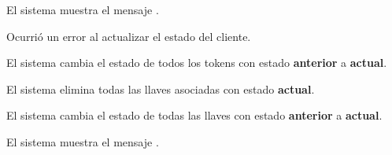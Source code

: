 {\begin{trayectoriaAlternativa}
    \item El sistema muestra el mensaje
      .


  \end{trayectoriaAlternativa}

  \begin{trayectoriaAlternativa}
    {Ocurrió un error al actualizar el estado del cliente.}

    \item El sistema cambia el estado de todos los tokens con estado
      \textbf{anterior} a \textbf{actual}.

    \item El sistema elimina todas las llaves asociadas con estado
      \textbf{actual}.

    \item El sistema cambia el estado de todas las llaves con estado
      \textbf{anterior} a \textbf{actual}.

    \item El sistema muestra el mensaje
      .


  \end{trayectoriaAlternativa}
}
